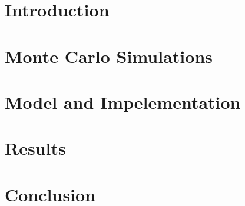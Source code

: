 \documentclass[a4paper,headsepline,bibtotocnumbered,12pt,titlepage,twoside]{scrartcl} %
\begin{document}
    
    \thispagestyle{empty}
    \cleardoublepage
    \setcounter{page}{1}
    \tableofcontents
    \newpage
    \listoffigures
    \newpage
    \setcounter{page}{1}

    \newpage
    \section{Introduction}
        

    \section{Monte Carlo Simulations}
        

    \section{Model and Impelementation}
        

    \section{Results}
        

    \section{Conclusion}
        

    
    

    \cleardoublepage
    
\end{document}
